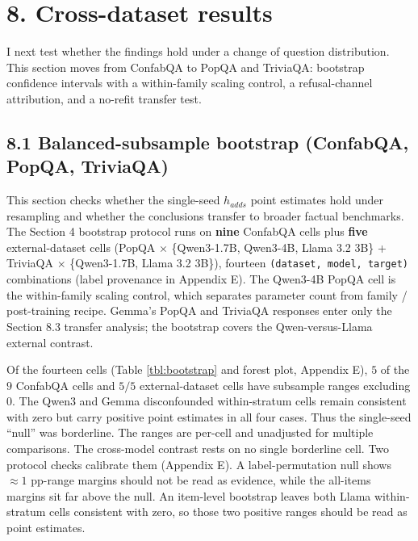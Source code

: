\section{8. Cross-dataset results}\label{cross-dataset-results}

I next test whether the findings hold under a change of question distribution. This section
moves from ConfabQA to PopQA and TriviaQA: bootstrap confidence
intervals with a within-family scaling control, a refusal-channel
attribution, and a no-refit transfer test.

\subsection{8.1 Balanced-subsample bootstrap (ConfabQA, PopQA,
TriviaQA)}\label{balanced-subsample-bootstrap-confabqa-popqa-triviaqa}

This section checks whether the single-seed \(h_{adds}\) point estimates hold under resampling and whether the conclusions transfer to broader factual benchmarks.
The Section 4 bootstrap protocol runs on \textbf{nine} ConfabQA cells
plus \textbf{five} external-dataset cells (PopQA \(\times\)
\{Qwen3-1.7B, Qwen3-4B, Llama 3.2 3B\} + TriviaQA \(\times\)
\{Qwen3-1.7B, Llama 3.2 3B\}), fourteen
\texttt{(dataset,\ model,\ target)} combinations (label provenance in
Appendix E). The Qwen3-4B PopQA cell is the within-family scaling control, which separates parameter count from family / post-training recipe. Gemma's PopQA and TriviaQA responses enter only the Section 8.3 transfer analysis; the bootstrap covers the Qwen-versus-Llama external contrast.

Of the fourteen cells (Table \ref{tbl:bootstrap} and forest plot, Appendix E), \(5\) of the \(9\) ConfabQA cells and \(5/5\) external-dataset cells have subsample ranges excluding \(0\). The Qwen3
and Gemma disconfounded within-stratum cells remain consistent with zero
but carry positive point estimates in all four cases. Thus the single-seed
``null'' was borderline. The ranges are per-cell and unadjusted for multiple comparisons. The cross-model
contrast rests on no single borderline cell. Two protocol checks
calibrate them (Appendix E). A label-permutation null shows
\(\approx 1\) pp-range margins should not be read as evidence, while the
all-items margins sit far above the null. An item-level bootstrap leaves
both Llama within-stratum cells consistent with zero, so those two positive ranges should be read as point estimates.

